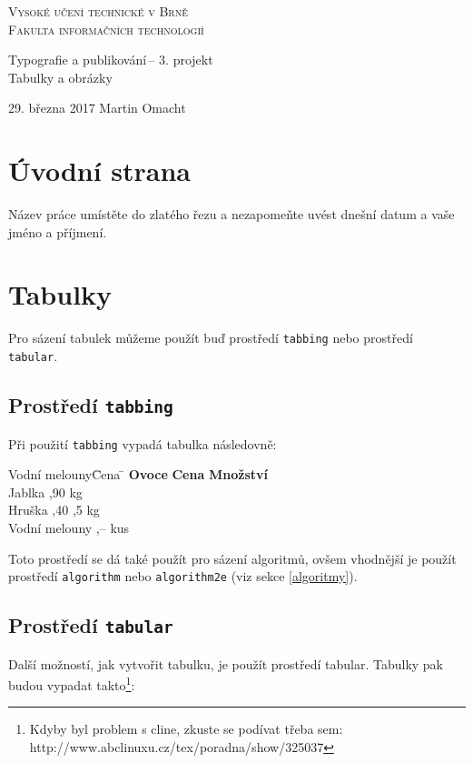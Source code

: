 \documentclass[11pt,a4paper]{article}
\begin{document}
	\begin{titlepage}
		\begin{center}
			\Huge
			\textsc{Vysoké učení technické v Brně\\[-2mm]
			\huge Fakulta informačních technologií}
		
			
			\LARGE
			Typografie a publikování\,-- 3. projekt\\[-0.5mm]
			\Huge Tabulky a obrázky
		\end{center}
		{\Large 29. března 2017 \hfill Martin Omacht}
	\end{titlepage}
	
	\section{Úvodní strana}
	Název práce umístěte do zlatého řezu a nezapomeňte uvést dnešní datum a vaše jméno a příjmení.
	
	\section{Tabulky}
	Pro sázení tabulek můžeme použít buď prostředí \texttt{tabbing} nebo prostředí \texttt{tabular}.

	\subsection{Prostředí \texttt{tabbing}}
	Při použití \texttt{tabbing} vypadá tabulka následovně:
	
		\begin{tabbing}
			Vodní melouny\qquad \= Cena \qquad \= \kill
			\textbf{Ovoce} 	\> \textbf{Cena} 	\> \textbf{Množství} \\
			Jablka 			,90			 kg \\
			Hruška			,40			,5 kg \\
			Vodní melouny	,--				 kus \\
		\end{tabbing}
	
	\noindent Toto prostředí se dá také použít pro sázení algoritmů, ovšem vhodnější je použít prostředí \texttt{algorithm} nebo \texttt{algorithm2e} (viz sekce \ref{algoritmy}).

	\subsection{Prostředí \texttt{tabular}}
	Další možností, jak vytvořit tabulku, je použít prostředí tabular. Tabulky pak 
	budou vypadat takto\footnote{Kdyby byl problem s cline, zkuste se podívat třeba sem: http://www.abclinuxu.cz/tex/poradna/show/325037}:
	
\end{document}
